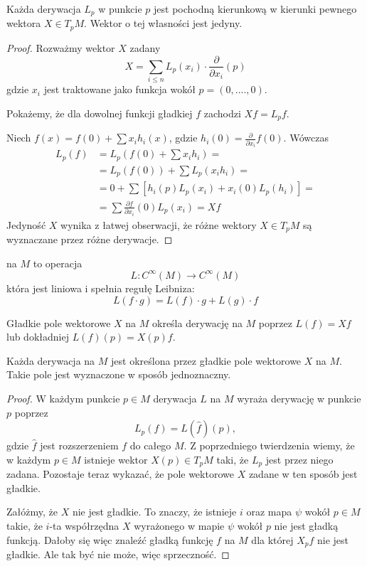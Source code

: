 \begin{theorem}
  Każda derywacja $L_p$ w punkcie $p$ jest pochodną kierunkową w kierunki pewnego wektora $X\in T_pM$. Wektor o tej własności jest jedyny.
\end{theorem}

\begin{proof}
  Rozważmy wektor $X$ zadany
  $$X=\sum_{i\leq n}L_p(x_i)\cdot\frac{\partial}{\partial x_i}(p)$$
  gdzie $x_i$ jest traktowane jako funkcja wokół $p=(0,....,0)$.

  Pokażemy, że dla dowolnej funkcji gładkiej $f$ zachodzi $Xf=L_pf$.

  Niech $f(x)=f(0)+\sum x_ih_i(x)$, gdzie $h_i(0)=\frac{\partial}{\partial x_i}f(0)$. Wówczas
  \begin{align*}
    L_p(f)&=L_p(f(0)+\sum x_ih_i)=\\
          &=L_p(f(0))+\sum L_p(x_ih_i)=\\
          &=0+\sum[h_i(p)L_p(x_i)+x_i(0)L_p(h_i)]=\\
          &=\sum \frac{\partial f}{\partial x_i}(0)L_p(x_i)=Xf
  \end{align*}
  Jedyność $X$ wynika z łatwej obserwacji, że różne wektory $X\in T_pM$ są wyznaczane przez różne derywacje.
\end{proof}

\begin{definition}
   na $M$ to operacja
  $$L:C^\infty(M)\to C^\infty(M)$$
  która jest liniowa i spełnia regułę Leibniza:
  $$L(f\cdot g)=L(f)\cdot g+L(g)\cdot f$$
\end{definition}

\begin{example}
\item Gładkie pole wektorowe $X$ na $M$ określa derywację na $M$ poprzez $L(f)=Xf$ lub dokładniej $L(f)(p)=X(p)f$.
\end{example}

\begin{theorem}
  Każda derywacja na $M$ jest określona przez gładkie pole wektorowe $X$ na $M$. Takie pole jest wyznaczone w sposób jednoznaczny.
\end{theorem}

\begin{proof}
  W każdym punkcie $p\in M$ derywacja $L$ na $M$ wyraża derywację w punkcie $p$ poprzez
  $$L_p(f)=L(\hat{f})(p),$$
  gdzie $\hat{f}$ jest rozszerzeniem $f$ do całego $M$. Z poprzedniego twierdzenia wiemy, że w każdym $p\in M$ istnieje wektor $X(p)\in T_pM$ taki, że $L_p$ jest przez niego zadana. Pozostaje teraz wykazać, że pole wektorowe $X$ zadane w ten sposób jest gładkie.

  Załóżmy, że $X$ nie jest gładkie. To znaczy, że istnieje $i$ oraz mapa $\psi$ wokół $p\in M$ takie, że $i$-ta współrzędna $X$ wyrażonego w mapie $\psi$ wokół $p$ nie jest gładką funkcją. Dałoby się więc znaleźć gładką funkcję $f$ na $M$ dla której $X_pf$ nie jest gładkie. Ale tak być nie może, więc sprzeczność.
\end{proof}

